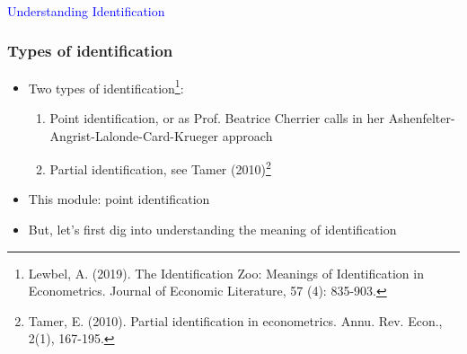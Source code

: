 \documentclass{beamer}
\begin{document}
\begin{frame}
	\frametitle{}
	\begin{center}
		\Large\textcolor{blue}{Understanding Identification}
	\end{center}
\end{frame}

\begin{frame}
	\frametitle{Types of identification}
	\begin{itemize}
		\item Two types of identification\footnote{Lewbel, A. (2019). The Identification Zoo: Meanings of Identification in Econometrics. Journal of Economic Literature, 57 (4): 835-903.
		}:
			\begin{enumerate}
				\item Point identification, or as Prof. Beatrice Cherrier calls in her \hyperlink{https://twitter.com/jondr44/status/1763348001668387071}{} Ashenfelter-Angrist-Lalonde-Card-Krueger approach
				\item Partial identification, see Tamer (2010)\footnote{Tamer, E. (2010). Partial identification in econometrics. Annu. Rev. Econ., 2(1), 167-195.}
			\end{enumerate}
		\item This module: point identification
		
		\item But, let's first dig into understanding the meaning of identification
	\end{itemize}
\end{frame}
\end{document}
